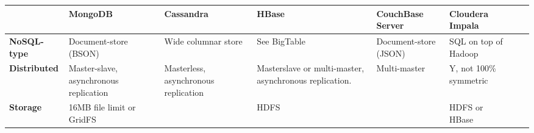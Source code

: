 \documentclass{article}
\begin{document}
\begin{table}[h]
\centering
\begin{tabular}{@{}l| L{3cm}| L{3cm}| L{3cm}| L{3cm}| L{3cm}| L{3cm}| L{3cm}|@{}}
\toprule
                                    & \textbf{MongoDB}                                                                                                                                                & \textbf{Cassandra}                                                                                                       & \textbf{HBase}                                                                     & \textbf{CouchBase Server}                                                           & \textbf{Cloudera Impala}            \\ \midrule
\textbf{NoSQL-type}                 & Document-store (BSON)                                                                                                                                           & Wide columnar store                                                                                                      & See BigTable                                                                       & Document-store (JSON)                                                               & SQL on top of Hadoop                \\ \midrule
\textbf{Distributed}                & Master-slave, asynchronous replication                                                                                                                          & Masterless, asynchronous replication                                                                                     & Masterslave or multi-master, asynchronous replication.                            & Multi-master                                                                        & Y, not 100\% symmetric              \\ \midrule
\textbf{Storage}                    & 16MB file limit or GridFS                                                                                                                                       &                                                                                                                          & HDFS                                                                               &                                                                                     & HDFS or HBase                       \\ \midrule

\end{tabular}
\end{table}
\end{document}

